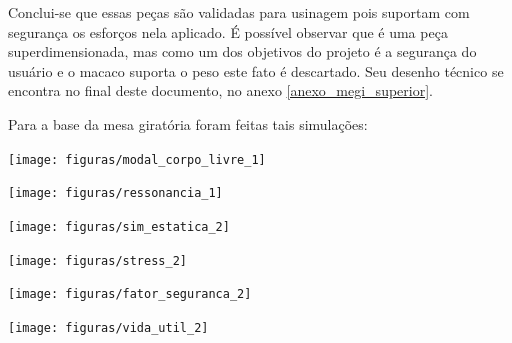     Conclui-se que essas peças são validadas para usinagem pois suportam com segurança os esforços nela aplicado. É possível observar que é uma peça superdimensionada, mas como um dos objetivos do projeto é a segurança do usuário e o macaco suporta o peso este fato é descartado. Seu desenho técnico se encontra no final deste documento, no anexo \ref{anexo_megi_superior}.

    Para a base da mesa giratória foram feitas tais simulações:

    \begin{center}
        \texttt{[image: figuras/modal\_corpo\_livre\_1]}
        \label{modal_corpo_livre_1}
    \end{center}

    \begin{center}
        \texttt{[image: figuras/ressonancia\_1]}
        \label{ressonancia_1}
    \end{center}
    
    \begin{center}
        \texttt{[image: figuras/sim\_estatica\_2]}
        \label{sim_estatica_2}
    \end{center}
    
    \begin{center}
        \texttt{[image: figuras/stress\_2]}
        \label{stress_2}
    \end{center}
    
    \begin{center}
        \texttt{[image: figuras/fator\_seguranca\_2]}
        \label{fator_seguranca_2}
    \end{center}
    
    \begin{center}
        \texttt{[image: figuras/vida\_util\_2]}
        \label{vida_util_2}
    \end{center}

